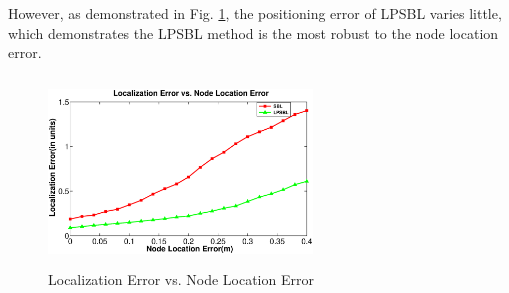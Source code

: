  However, as demonstrated in Fig. \ref{fig5}, the positioning error of LPSBL varies little, which demonstrates the LPSBL method is the most robust to the node location error.
  \begin{figure}[htb]
		   \vspace{-25mm}
			 \includegraphics[height=5.0cm,width=7.0cm]{image/fig5.eps}
            \vspace{25mm}
            \caption{Localization Error vs. Node Location Error}
             \vspace{-5mm}
             \label{fig5}
        \end{figure}

